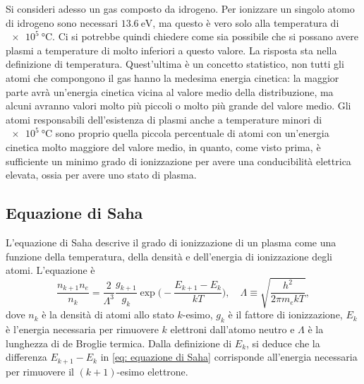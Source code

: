Si consideri adesso un gas composto da idrogeno. Per ionizzare un singolo atomo di idrogeno sono necessari $\SI{13.6}{\eV}$, ma questo è vero solo alla temperatura di $\SI{e5}{\celsius}$. Ci si potrebbe quindi chiedere come sia possibile che si possano avere plasmi a temperature di molto inferiori a questo valore. La risposta sta nella definizione di temperatura. Quest'ultima è un concetto statistico, non tutti gli atomi che compongono il gas hanno la medesima energia cinetica: la maggior parte avrà un'energia cinetica vicina al valore medio della distribuzione, ma alcuni avranno valori molto più piccoli o molto più grande del valore medio. Gli atomi responsabili dell'esistenza di plasmi anche a temperature minori di $\SI{e5}{\celsius}$ sono proprio quella piccola percentuale di atomi con un'energia cinetica molto maggiore del valore medio, in quanto, come visto prima, è sufficiente un minimo grado di ionizzazione per avere una conducibilità elettrica elevata, ossia per avere uno stato di plasma.

\subsection{Equazione di Saha}
L'equazione di Saha descrive il grado di ionizzazione di un plasma come una funzione della temperatura, della densità e dell'energia di ionizzazione degli atomi. L'equazione è
\begin{equation}
\label{eq: equazione di Saha}
    \frac{n_{k + 1}n_e}{n_k} = \frac{2}{\Lambda^3}\frac{g_{k + 1}}{g_k}\exp{\bigg(-\frac{E_{k + 1} - E_k}{kT}\bigg)},\quad \Lambda \equiv \sqrt{\frac{h^2}{2\pi m_ekT}},
\end{equation}
dove $n_k$ è la densità di atomi allo stato $k$-esimo, $g_k$ è il fattore di ionizzazione, $E_k$ è l'energia necessaria per rimuovere $k$ elettroni dall'atomo neutro e $\Lambda$ è la lunghezza di de Broglie termica. Dalla definizione di $E_k$, si deduce che la differenza $E_{k + 1} - E_k$ in \eqref{eq: equazione di Saha} corrisponde all'energia necessaria per rimuovere il $(k + 1)$-esimo elettrone. 


